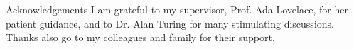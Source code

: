 \begin{frontchapter}{Acknowledgements}
I am grateful to my supervisor, Prof. Ada Lovelace, for her patient
guidance, and to Dr. Alan Turing for many stimulating discussions. Thanks
also go to my colleagues and family for their support.
\end{frontchapter}
